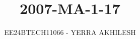 \documentclass[journal]{IEEEtran}
\begin{document}

\vspace{3cm}

\title{2007-MA-1-17}
\author{EE24BTECH11066 - YERRA AKHILESH
}
{\let\newpage\relax\maketitle}

\renewcommand{\thefigure}{\theenumi}
\renewcommand{\thetable}{\theenumi}
\setlength{\intextsep}{10pt} %


\renewcommand{\thetable}{\theenumi}
\end{document}
